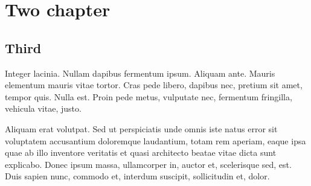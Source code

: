 \chapter{Two chapter}
\section{Third}
Integer lacinia. Nullam dapibus fermentum ipsum. Aliquam ante. Mauris elementum mauris vitae tortor. Cras pede libero, dapibus nec, pretium sit amet, tempor quis. Nulla est. Proin pede metus, vulputate nec, fermentum fringilla, vehicula vitae, justo.

Aliquam erat volutpat. Sed ut perspiciatis unde omnis iste natus error sit voluptatem accusantium doloremque laudantium, totam rem aperiam, eaque ipsa quae ab illo inventore veritatis et quasi architecto beatae vitae dicta sunt explicabo. Donec ipsum massa, ullamcorper in, auctor et, scelerisque sed, est. Duis sapien nunc, commodo et, interdum suscipit, sollicitudin et, dolor.
